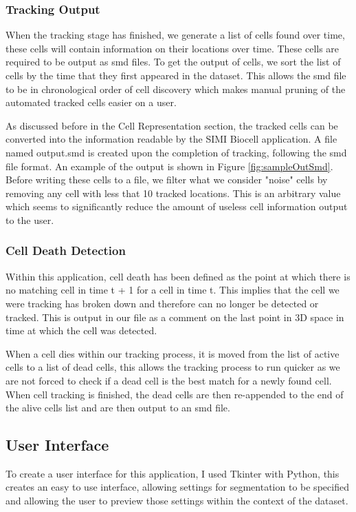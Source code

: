 \documentclass[12pt a4paper]{article}
\begin{document}
\subsubsection{Tracking Output}
When the tracking stage has finished, we generate a list of cells found over time, these cells will contain information on their locations over time. These cells are required to be output as smd files. To get the output of cells, we sort the list of cells by the time that they first appeared in the dataset. This allows the smd file to be in chronological order of cell discovery which makes manual pruning of the automated tracked cells easier on a user. 

As discussed before in the Cell Representation section, the tracked cells can be converted into the information readable by the SIMI Biocell application. A file named output.smd is created upon the completion of tracking, following the smd file format. An example of the output is shown in Figure \ref{fig:sampleOutSmd}. Before writing these cells to a file, we filter what we consider "noise" cells by removing any cell with less that 10 tracked locations. This is an arbitrary value which seems to significantly reduce the amount of useless cell information output to the user.

\subsubsection{Cell Death Detection}
Within this application, cell death has been defined as the point at which there is no matching cell in time t + 1 for a cell in time t. This implies that the cell we were tracking has broken down and therefore can no longer be detected or tracked. This is output in our file as a comment on the last point in 3D space in time at which the cell was detected.

When a cell dies within our tracking process, it is moved from the list of active cells to a list of dead cells, this allows the tracking process to run quicker as we are not forced to check if a dead cell is the best match for a newly found cell. When cell tracking is finished, the dead cells are then re-appended to the end of the alive cells list and are then output to an smd file.
\subsection{User Interface}
To create a user interface for this application, I used Tkinter with Python, this creates an easy to use interface, allowing settings for segmentation to be specified and allowing the user to preview those settings within the context of the dataset. 
\end{document}
